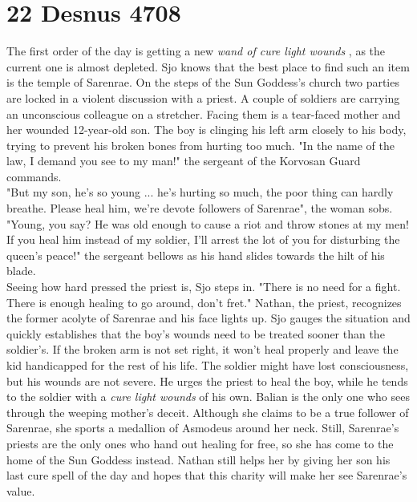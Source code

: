 \section{22 Desnus 4708}

The first order of the day is getting a new {\itshape wand of cure light wounds} , as the current one is almost depleted. Sjo knows that the best place to find such an item is the temple of Sarenrae. On the steps of the Sun Goddess's church two parties are locked in a violent discussion with a priest. A couple of soldiers are carrying an unconscious colleague on a stretcher. Facing them is a tear-faced mother and her wounded 12-year-old son. The boy is clinging his left arm closely to his body, trying to prevent his broken bones from hurting too much. "In the name of the law, I demand you see to my man!" the sergeant of the Korvosan Guard commands.\\

"But my son, he's so young ... he's hurting so much, the poor thing can hardly breathe. Please heal him, we're devote followers of Sarenrae", the woman sobs.\\

"Young, you say? He was old enough to cause a riot and throw stones at my men! If you heal him instead of my soldier, I'll arrest the lot of you for disturbing the queen's peace!" the sergeant bellows as his hand slides towards the hilt of his blade.\\

Seeing how hard pressed the priest is, Sjo steps in. "There is no need for a fight. There is enough healing to go around, don't fret." Nathan, the priest, recognizes the former acolyte of Sarenrae and his face lights up. Sjo gauges the situation and quickly establishes that the boy's wounds need to be treated sooner than the soldier's. If the broken arm is not set right, it won't heal properly and leave the kid handicapped for the rest of his life. The soldier might have lost consciousness, but his wounds are not severe. He urges the priest to heal the boy, while he tends to the soldier with a {\itshape cure light wounds} of his own. Balian is the only one who sees through the weeping mother's deceit. Although she claims to be a true follower of Sarenrae, she sports a medallion of Asmodeus around her neck. Still, Sarenrae's priests are the only ones who hand out healing for free, so she has come to the home of the Sun Goddess instead. Nathan still helps her by giving her son his last cure spell of the day and hopes that this charity will make her see Sarenrae's value.\\

